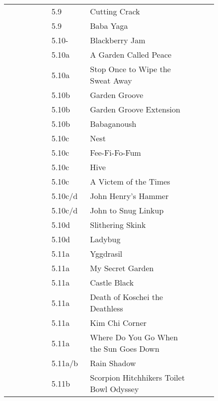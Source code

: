 \begin{flushleft}
\begin{center}
\begin{supertabular}{p{0.18\linewidth}p{0.13\linewidth}p{0.45\linewidth}p{0.08\linewidth}}
&5.9&Cutting Crack & \pageref{rt:Cutting Crack} \\
&5.9&Baba Yaga & \pageref{rt:Baba Yaga} \\
&5.10-&Blackberry Jam & \pageref{rt:Blackberry Jam} \\
&5.10a&A Garden Called Peace & \pageref{rt:A Garden Called Peace} \\
&5.10a&Stop Once to Wipe the Sweat Away & \pageref{rt:Stop Once to Wipe the Sweat Away} \\
&5.10b&Garden Groove & \pageref{rt:Garden Groove} \\
&5.10b&Garden Groove Extension & \pageref{vr:Garden Groove Extension} \\
&5.10b&Babaganoush & \pageref{rt:Babaganoush} \\
&5.10c&Nest & \pageref{rt:Nest} \\
&5.10c&Fee-Fi-Fo-Fum & \pageref{rt:Fee-Fi-Fo-Fum} \\
&5.10c&Hive & \pageref{rt:Hive} \\
&5.10c&A Victem of the Times & \pageref{vr:A Victem of the Times} \\
&5.10c/d&John Henry's Hammer & \pageref{rt:John Henry's Hammer} \\
&5.10c/d&John to Snug Linkup & \pageref{vr:John to Snug Linkup} \\
&5.10d&Slithering Skink & \pageref{rt:Slithering Skink} \\
&5.10d&Ladybug & \pageref{rt:Ladybug} \\
&5.11a&Yggdrasil & \pageref{rt:Yggdrasil} \\
&5.11a&My Secret Garden & \pageref{rt:My Secret Garden} \\
&5.11a&Castle Black & \pageref{rt:Castle Black} \\
&5.11a&Death of Koschei the Deathless & \pageref{rt:Death of Koschei the Deathless} \\
&5.11a&Kim Chi Corner & \pageref{rt:Kim Chi Corner} \\
&5.11a&Where Do You Go When the Sun Goes Down & \pageref{rt:Where Do You Go When the Sun Goes Down} \\
&5.11a/b&Rain Shadow & \pageref{rt:Rain Shadow} \\
&5.11b&Scorpion Hitchhikers Toilet Bowl Odyssey & \pageref{rt:Scorpion Hitchhikers Toilet Bowl Odyssey} \\

\end{supertabular}
\end{center}
\end{flushleft}
